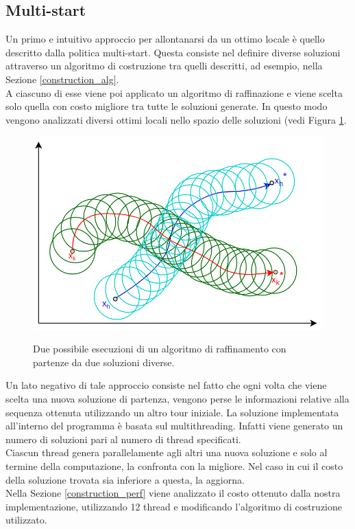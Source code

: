 \subsection{Multi-start}
Un primo e intuitivo approccio per allontanarsi da un ottimo locale è quello descritto dalla politica multi-start. Questa consiste nel definire diverse soluzioni attraverso un algoritmo di costruzione tra quelli descritti, ad esempio, nella Sezione \ref{construction_alg}.\\
A ciascuno di esse viene poi applicato un algoritmo di raffinazione e viene scelta solo quella con costo migliore tra tutte le soluzioni generate. In questo modo vengono analizzati diversi ottimi locali nello spazio delle soluzioni (vedi Figura \ref{multi_start}. 
\begin{figure}[H] 
\begin{center} 
  \includegraphics[scale=0.5]{Images/multistart}\\ 
  \caption{\footnotesize{Due possibile esecuzioni di un algoritmo di raffinamento con partenze da due soluzioni diverse.}}
  \label{multi_start}
\end{center}
\end{figure}
Un lato negativo di tale approccio consiste nel fatto che ogni volta che viene scelta una nuova soluzione di partenza, vengono perse le informazioni relative alla sequenza ottenuta utilizzando un altro tour iniziale. La soluzione implementata all'interno del programma è basata sul multithreading. Infatti viene generato un numero di soluzioni pari al numero di thread specificati.\\
Ciascun thread genera parallelamente agli altri una nuova soluzione e solo al termine della computazione, la confronta con la migliore. Nel caso in cui il costo della soluzione trovata sia inferiore a questa, la aggiorna. \\
Nella Sezione \ref{construction_perf} viene analizzato il costo ottenuto dalla nostra implementazione, utilizzando 12 thread e modificando l'algoritmo di costruzione utilizzato.

